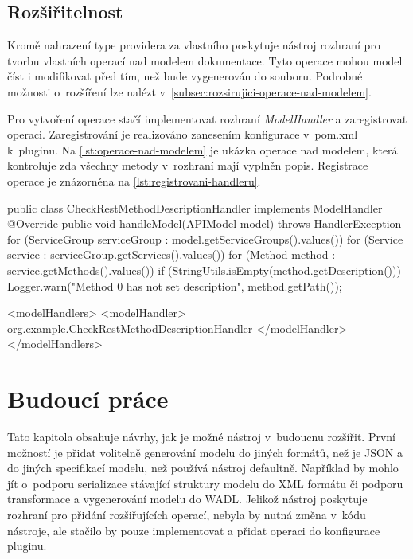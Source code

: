 \documentclass[11pt,twoside,a4paper]{book}
\begin{document}
\section{Rozšiřitelnost}

Kromě nahrazení type providera za vlastního poskytuje nástroj rozhraní pro
tvorbu vlastních operací nad modelem dokumentace. Tyto operace mohou model číst
i modifikovat před tím, než bude vygenerován do souboru. Podrobné možnosti
o~rozšíření lze nalézt v~\ref{subsec:rozsirujici-operace-nad-modelem}.

Pro vytvoření operace stačí implementovat rozhraní {\em ModelHandler} a
zaregistrovat operaci. Zaregistrování je realizováno zanesením konfigurace
v~pom.xml k~pluginu. Na \ref{lst:operace-nad-modelem} je ukázka operace nad modelem, která
kontroluje zda všechny metody v~rozhraní mají vyplněn popis. Registrace operace
je znázorněna na \ref{lst:registrovani-handleru}.

\begin{code}[frame=single, caption={Ukázka použití operace nad modelem}, label={lst:operace-nad-modelem}] 
public class CheckRestMethodDescriptionHandler implements ModelHandler {
  @Override
  public void handleModel(APIModel model) throws HandlerException {
    for (ServiceGroup serviceGroup : model.getServiceGroups().values()) {
      for (Service service : serviceGroup.getServices().values()) {
        for (Method method : service.getMethods().values()) {
          if (StringUtils.isEmpty(method.getDescription())) {
            Logger.warn("Method {0} has not set description",
              method.getPath());
          }
        }
      }
    }
  }
}
\end{code}

\begin{code}[frame=single, caption={Registrování handleru pro model},
label={lst:registrovani-handleru}] 
<modelHandlers>
    <modelHandler>
        org.example.CheckRestMethodDescriptionHandler
    </modelHandler>
</modelHandlers>
\end{code}

\chapter{Budoucí práce}

Tato kapitola obsahuje návrhy, jak je možné nástroj v~budoucnu rozšířit.
První možností je přidat volitelně generování modelu do jiných
formátů, než je JSON a do jiných specifikací modelu, než používá nástroj
defaultně. Například by mohlo jít o~podporu serializace stávající struktury
modelu do XML formátu či podporu transformace a vygenerování modelu do WADL.
Jelikož nástroj poskytuje rozhraní pro přidání rozšiřujících operací, nebyla by
nutná změna v~kódu nástroje, ale stačilo by pouze implementovat a přidat operaci do konfigurace pluginu.
\end{document}
